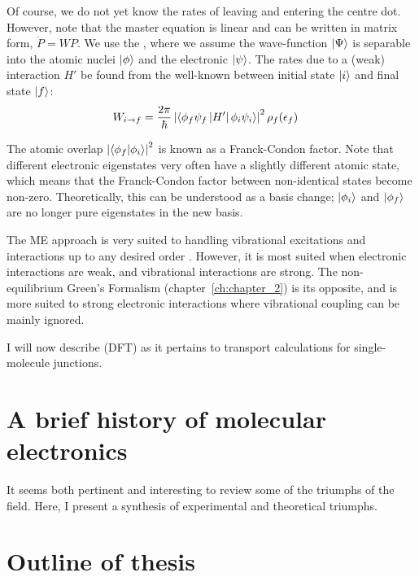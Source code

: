 Of course, we do not yet know the rates of leaving and entering the centre dot. However, note that the master equation is linear and can be written in matrix form, $\dot{P} = W P$. We use the , where we assume the wave-function $\ket{\Psi}$ is separable into the atomic nuclei $\ket{\phi}$ and the electronic $\ket{\psi}$. The rates due to a (weak) interaction $H'$ be found from the well-known  between initial state $\ket{i}$ and final state $\ket{f}$:
\begin{align*}
W_{i\rightarrow f} &= \frac{2\pi}{\hbar} \left| \braket{\phi_f \psi_f \left|H'\right| \phi_i \psi_i}\right|^2 \rho_f (\epsilon_f)
\end{align*}

The atomic overlap $\left| \braket{ \phi_f | \phi_i }\right|^2$ is known as a Franck-Condon factor. Note that different electronic eigenstates very often have a slightly different atomic state, which means that the Franck-Condon factor between non-identical states become non-zero. Theoretically, this can be understood as a basis change; $\ket{\phi_i}$ and $\ket{\phi_f}$ are no longer pure eigenstates in the new basis. 

The ME approach is very suited to handling vibrational excitations and interactions up to any desired order \cite{seldenthuis}. However, it is most suited when electronic interactions are weak, and vibrational interactions are strong. The non-equilibrium Green's Formalism (chapter~\ref{ch:chapter_2}) is its opposite, and is more suited to strong electronic interactions where vibrational coupling can be mainly ignored. 

I will now describe  (DFT) as it pertains to transport calculations for single-molecule junctions. 


\section{A brief history of molecular electronics}
It seems both pertinent and interesting to review some of the triumphs of the field. Here, I present a synthesis of experimental and theoretical triumphs.


\section{Outline of thesis}
